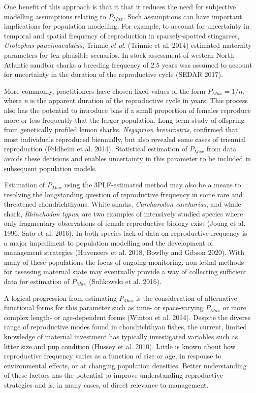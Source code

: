 \documentclass[
]{article}
\begin{document}
One benefit of this approach is that it that it reduces the need for subjective modelling assumptions relating to \(P_{Max}\). Such assumptions can have important implications for population modelling. For example, to account for uncertainty in temporal and spatial frequency of reproduction in sparsely-spotted stingarees, \emph{Urolophus paucimaculatus}, Trinnie \emph{et al}. (Trinnie et al. 2014) estimated maternity parameters for ten plausible scenarios. In stock assessment of western North Atlantic sandbar sharks a breeding frequency of 2.5 years was assumed to account for uncertainty in the duration of the reproductive cycle (SEDAR 2017).

More commonly, practitioners have chosen fixed values of the form \(P_{Max} = 1/n\), where \emph{n} is the apparent duration of the reproductive cycle in years. This process also has the potential to introduce bias if a small proportion of females reproduce more or less frequently that the larger population. Long-term study of offspring from genetically profiled lemon sharks, \emph{Negaprion brevirostris}, confirmed that most individuals reproduced biennially, but also revealed some cases of triennial reproduction (Feldheim et al. 2014). Statistical estimation of \(P_{Max}\) from data avoids these decisions and enables uncertainty in this parameter to be included in subsequent population models.

Estimation of \(P_{Max}\) using the 3PLF-estimated method may also be a means to resolving the longstanding question of reproductive frequency in some rare and threatened chondrichthyans. White sharks, \emph{Carcharodon carcharias}, and whale shark, \emph{Rhinchodon typus}, are two examples of intensively studied species where only fragmentary observations of female reproductive biology exist (Joung et al. 1996, Sato et al. 2016). In both species lack of data on reproductive frequency is a major impediment to population modelling and the development of management strategies (Huveneers et al. 2018, Bowlby and Gibson 2020). With many of these populations the focus of ongoing monitoring, non-lethal methods for assessing maternal state may eventually provide a way of collecting sufficient data for estimation of \(P_{Max}\) (Sulikowski et al. 2016).

A logical progression from estimating \(P_{Max}\) is the consideration of alternative functional forms for this parameter such as time- or space-varying \(P_{Max}\) or more complex length- or age-dependent forms (Winton et al. 2014). Despite the diverse range of reproductive modes found in chondrichthyan fishes, the current, limited knowledge of maternal investment has typically investigated variables such as litter size and pup condition (Hussey et al. 2010). Little is known about how reproductive frequency varies as a function of size or age, in response to environmental effects, or at changing population densities. Better understanding of these factors has the potential to improve understanding reproductive strategies and is, in many cases, of direct relevance to management.
\end{document}
